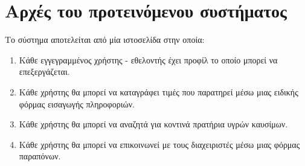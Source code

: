 \section{Αρχές του προτεινόμενου συστήματος}

Το σύστημα αποτελείται από μία ιστοσελίδα στην οποία:
\begin{enumerate}
	\item Κάθε εγγεγραμμένος χρήστης - εθελοντής έχει προφίλ το οποίο μπορεί να επεξεργάζεται.
	\item Κάθε χρήστης θα μπορεί να καταγράφει τιμές που παρατηρεί μέσω μιας ειδικής φόρμας εισαγωγής πληροφοριών.
	\item Κάθε χρήστης θα μπορεί να αναζητά για κοντινά πρατήρια υγρών καυσίμων.
  \item Κάθε χρήστης θα μπορεί να επικοινωνεί με τους διαχειριστές μέσω μιας φόρμας παραπόνων.
\end{enumerate}

